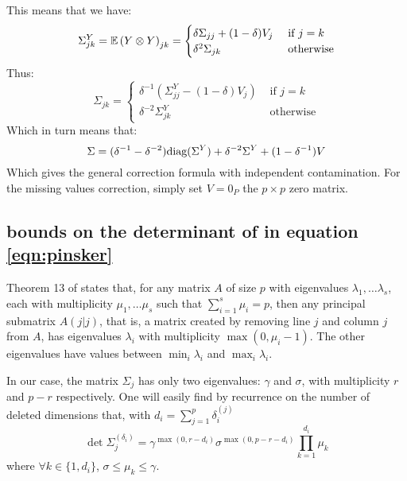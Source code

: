 \documentclass{article}
\numberwithin{equation}{section}
\numberwithin{equation}{section}
\begin{document}
        This means that we have:
        \begin{equation}
            \Sigma^Y_{jk} = \mathbb{E} \left( Y \otimes Y \right)_{jk} = \begin{cases}
                \delta \Sigma_{jj} + (1 - \delta) V_j & \text{ if $j = k$}\\
                \delta^2 \Sigma_{jk}& \text{ otherwise}
            \end{cases}
        \end{equation}
        Thus:
        \begin{equation}
            \Sigma_{jk} = \begin{cases}
                \delta^{-1} \left(\Sigma^Y_{jj} - (1-\delta) V_j\right) & \text{ if $j = k$}\\
                \delta^{-2} \Sigma^Y_{jk}& \text{ otherwise}
            \end{cases}
        \end{equation}
        Which in turn means that:
        \begin{equation}
            \Sigma = (\delta^{-1} - \delta^{-2}) \text{diag}(\Sigma^Y) + \delta^{-2} \Sigma^Y + (1 - \delta^{-1}) V
        \end{equation}
        Which gives the general correction formula with independent contamination. For the missing values correction, simply set $V = 0_P$ the $p\times p$ zero matrix.
        
        \subsection{bounds on the determinant of in equation \ref{eqn:pinsker}}
        \label{proof:determinant}
        
            Theorem 13 of  \cite{thompsonPrincipalSubmatricesNormal1966} states that, for any matrix $A$ of size $p$ with eigenvalues $\lambda_1, \dots \lambda_s$, each with multiplicity $\mu_1, \dots \mu_s$ such that $\sum_{i=1}^s \mu_i = p$, then any principal submatrix $A(j\vert j)$, that is, a matrix created by removing line $j$ and column $j$ from $A$, has eigenvalues $\lambda_i$ with multiplicity $\max (0, \mu_i - 1)$. The other eigenvalues have values between $\min_i \lambda_i$ and $\max_i \lambda_i$. 
            
            In our case, the matrix $\Sigma_j$ has only two eigenvalues: $\gamma$ and $\sigma$, with multiplicity $r$ and $p-r$ respectively. One will easily find by recurrence on the number of deleted dimensions that, with $d_i = \sum_{j=1}^p \delta_i^{(j)}$
            \begin{equation}
            \det \Sigma_j^{(\delta_i)} = \gamma^{\max (0, r-d_i)} \sigma^{\max(0, p-r-d_i)} \prod_{k=1}^{d_i} \mu_k
            \end{equation}
            where $\forall k \in \lbrace 1, d_i \rbrace$, $\sigma \leq \mu_k \leq \gamma$.
            
\end{document}
